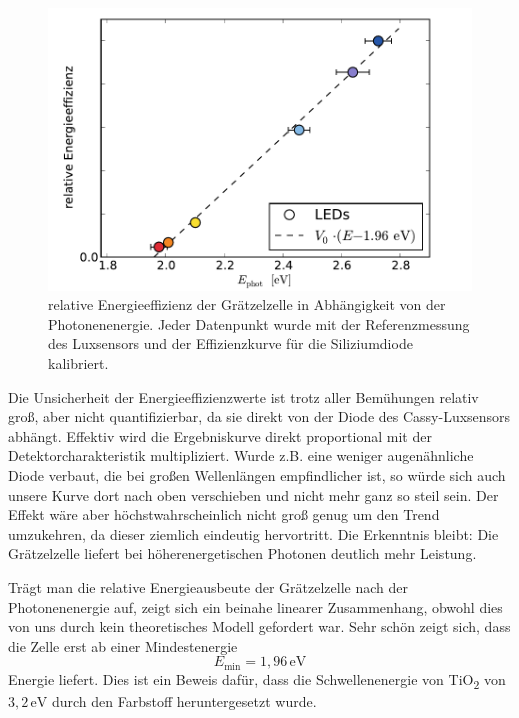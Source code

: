 \documentclass[11pt]{scrartcl}
\newcommand{\unit}[1]{\ensuremath{\,\mathrm{#1}}} %
\begin{document}
\begin{figure}[ht]
\begin{center}
\includegraphics[width=1.0\textwidth]{images/graetzel_photon_energy.pdf}
\end{center}
\vspace{-1.5\baselineskip}
\caption{relative Energieeffizienz der Grätzelzelle in Abhängigkeit von der Photonenenergie. Jeder Datenpunkt wurde mit der Referenzmessung des Luxsensors und der Effizienzkurve für die Siliziumdiode kalibriert.}
\label{lambda_korrigiert}
\end{figure}

Die Unsicherheit der Energieeffizienzwerte ist trotz aller Bemühungen relativ groß, aber nicht quantifizierbar, da sie direkt von der Diode des Cassy-Luxsensors abhängt. Effektiv wird die Ergebniskurve direkt proportional mit der Detektorcharakteristik multipliziert. Wurde z.B. eine weniger augenähnliche Diode verbaut, die bei großen Wellenlängen empfindlicher ist, so würde sich auch unsere Kurve dort nach oben verschieben und nicht mehr ganz so steil sein. Der Effekt wäre aber höchstwahrscheinlich nicht groß genug um den Trend umzukehren, da dieser ziemlich eindeutig hervortritt. Die Erkenntnis bleibt: Die Grätzelzelle liefert bei höherenergetischen Photonen deutlich mehr Leistung.

Trägt man die relative Energieausbeute der Grätzelzelle nach der Photonenenergie auf, zeigt sich ein beinahe linearer Zusammenhang, obwohl dies von uns durch kein theoretisches Modell gefordert war. Sehr schön zeigt sich, dass die Zelle erst ab einer Mindestenergie
\[
E_{\text{min}} = 1,96 \unit{eV}
\]
Energie liefert. Dies ist ein Beweis dafür, dass die Schwellenenergie von TiO\textsubscript{2} von $3,2 \unit{eV}$ durch den Farbstoff heruntergesetzt wurde.
\end{document}
